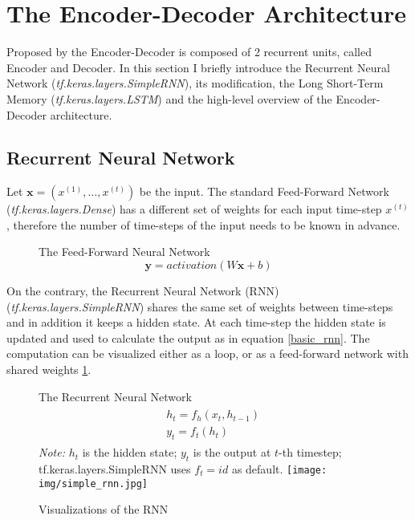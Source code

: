 \section {The Encoder-Decoder Architecture}

Proposed by \citep{sutskever2014sequence} the Encoder-Decoder is composed of 2 recurrent units, called Encoder and Decoder. In this section I briefly introduce the Recurrent Neural Network (\emph{tf.keras.layers.SimpleRNN}), its modification, the Long Short-Term Memory (\emph{tf.keras.layers.LSTM}) \citep{hochreiter1997} and the high-level overview of the Encoder-Decoder architecture.

\subsection{Recurrent Neural Network}

Let $\boldsymbol{x}=(x^{(1)},\dots,x^{(t)})$ be the input. The standard Feed-Forward Network (\emph{tf.keras.layers.Dense}) has a different set of weights for each input time-step $x^{(t)}$, therefore the number of time-steps of the input needs to be known in advance.

\begin{figure}[!h]
\centering
The Feed-Forward Neural Network
\begin{equation}
\boldsymbol{y} = activation(W\boldsymbol{x} + b) \mbox{}
\end{equation}
\end{figure}
On the contrary, the Recurrent Neural Network (RNN) \citep{rumelhart_rnn1988} (\emph{tf.keras.layers.SimpleRNN}) shares the same set of weights between time-steps and in addition it keeps a hidden state. At each time-step the hidden state is updated and used to calculate the output as in equation \ref{basic_rnn}. The computation can be visualized either as a loop, or as a feed-forward network with shared weights \ref{vis_rnn}.


\begin{figure}[!h]
    \centering
    The Recurrent Neural Network
    \begin{align} \label{basic_rnn}
    \begin{split}
        &h_t = f_h(x_t, h_{t-1}) \\
        &y_t = f_t(h_t)
    \end{split}
    \end{align}
    \footnotesize{\textit{Note:} $h_t$ is the hidden state; $y_t$ is the output at $t$-th timestep; tf.keras.layers.SimpleRNN uses $f_t = id$ as default.}
    \texttt{[image: img/simple\_rnn.jpg]}
    \caption{Visualizations of the RNN} \label{vis_rnn}
\end{figure}

